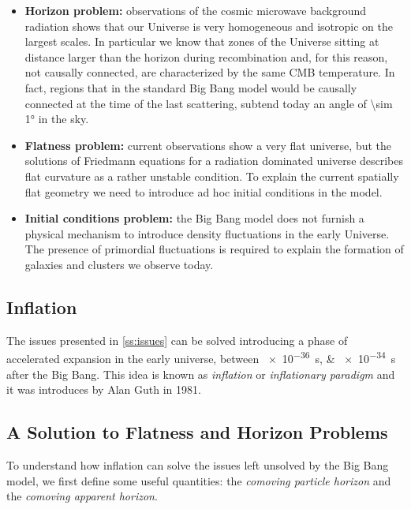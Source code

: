 \begin{itemize}
        \item \textbf{Horizon problem:} observations of the cosmic
        microwave background radiation shows that our Universe is very
        homogeneous and isotropic on the largest scales. In particular we
        know that zones of the Universe sitting at distance larger than the
        horizon during recombination and, for this reason, not causally
        connected, are characterized by the same CMB temperature.
        In fact, regions that in the standard Big Bang model would be causally
        connected at the time of the last scattering, subtend today an
        angle of \ang{\sim 1} in the sky.

        \item \textbf{Flatness problem:} current observations show a very
        flat universe, but the solutions of Friedmann equations for a
        radiation dominated universe describes flat curvature as a rather
        unstable condition. To explain the current spatially flat geometry
        we need to introduce ad hoc initial conditions in the model.

        \item \textbf{Initial conditions problem:} the Big Bang model
        does not furnish a physical mechanism to introduce density
        fluctuations in the early Universe. The presence of primordial
        fluctuations is required to explain the formation of galaxies and
        clusters we observe today.
\end{itemize}

\subsection{Inflation}

The issues presented in \autoref{ss:issues} can be solved introducing a
phase of accelerated expansion in the early universe, between
\SIlist{e-36;e-34}{\second} after the Big Bang. This idea is known as
\emph{inflation} or \emph{inflationary paradigm} and it was introduces by
Alan Guth in 1981.

\subsection{A Solution to Flatness and Horizon Problems}

To understand how inflation can solve the issues left unsolved by the Big Bang
model, we first define some useful quantities: the \emph{comoving particle
horizon} and the \emph{comoving apparent horizon}.

